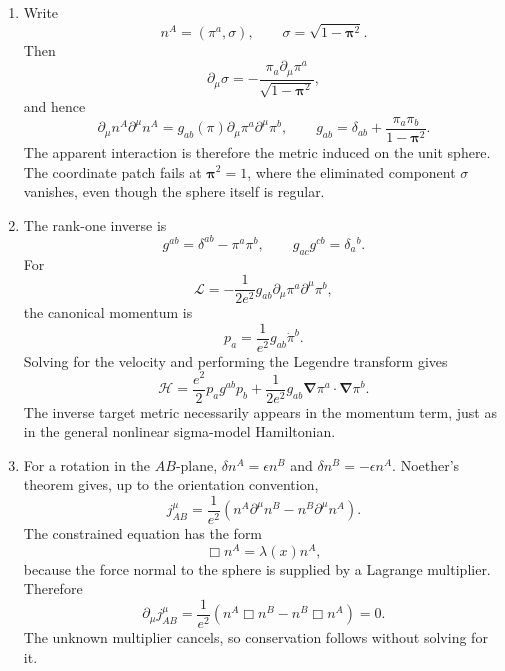 \begin{enumerate}
\begin{enumerate}
\item
Write
\[
 n^A=(\pi^a,\sigma),\qquad
 \sigma=\sqrt{1-\boldsymbol\pi^2}.
\]
Then
\[
 \partial_\mu\sigma
 =-\frac{\pi_a\partial_\mu\pi^a}
         {\sqrt{1-\boldsymbol\pi^2}},
\]
and hence
\[
 \partial_\mu n^A\partial^\mu n^A
 =g_{ab}(\pi)\partial_\mu\pi^a\partial^\mu\pi^b,
\qquad
 g_{ab}=\delta_{ab}
 +\frac{\pi_a\pi_b}{1-\boldsymbol\pi^2}.
\]
The apparent interaction is therefore the metric induced on the unit
sphere.  The coordinate patch fails at
\(\boldsymbol\pi^2=1\), where the eliminated component \(\sigma\)
vanishes, even though the sphere itself is regular.
\item
The rank-one inverse is
\[
 g^{ab}=\delta^{ab}-\pi^a\pi^b,
\qquad g_{ac}g^{cb}=\delta_a{}^b .
\]
For
\[
 \mathcal L=-\frac1{2e^2}g_{ab}
 \partial_\mu\pi^a\partial^\mu\pi^b,
\]
the canonical momentum is
\[
 p_a=\frac1{e^2}g_{ab}\dot\pi^b .
\]
Solving for the velocity and performing the Legendre transform gives
\[
 \mathcal H
 =\frac{e^2}{2}p_ag^{ab}p_b
 +\frac1{2e^2}g_{ab}
 \boldsymbol\nabla\pi^a\cdot\boldsymbol\nabla\pi^b .
\]
The inverse target metric necessarily appears in the momentum term,
just as in the general nonlinear sigma-model Hamiltonian.
\item
For a rotation in the \(AB\)-plane,
\(\delta n^A=\epsilon n^B\) and
\(\delta n^B=-\epsilon n^A\).  Noether's theorem gives, up to the
orientation convention,
\[
 j^\mu_{AB}=\frac1{e^2}
 \left(n^A\partial^\mu n^B-n^B\partial^\mu n^A\right).
\]
The constrained equation has the form
\[
 \Box n^A=\lambda(x)n^A,
\]
because the force normal to the sphere is supplied by a Lagrange
multiplier.  Therefore
\[
 \partial_\mu j^\mu_{AB}
 =\frac1{e^2}(n^A\Box n^B-n^B\Box n^A)=0.
\]
The unknown multiplier cancels, so conservation follows without solving
for it.
\end{enumerate}


\end{enumerate}
